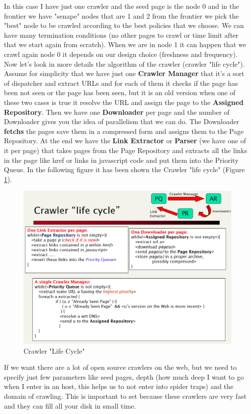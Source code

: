 In this case I have just one crawler and the seed page is the node 0 and in the frontier we have "senape" nodes that are 1 and 2 from the frontier we pick the "best" node to be crawled according to the best policies that we choose. We can have many termination conditions (no other pages to crawl or time limit after that we start again from scratch). When we are in node 1 it can happen that we crawl again node 0 it depends on our design choice (freshness and frequency).\newline
Now let's look in more details the algorithm of the crawler (crawler "life cycle"). Assume for simplicity that we have just one \textbf{Crawler Manager} that it's a sort of dispatcher and extract URLs and for each of them it checks if the page has been not seen or the page has been seen, but it is an old version when one of these two cases is true it resolve the URL and assign the page to the \textbf{Assigned Repository}. Then we have one \textbf{Downloader} per page and the number of Downloader gives you the idea of parallelism that we can do. The Downloader \textbf{fetchs} the pages save them in a compressed form and assigns them to the Page Repository. At the end we have the \textbf{Link Extractor} or \textbf{Parser} (we have one of it per page) that takes pages from the Page Repository and extracts all the links in the page like href or links in javascript code and put them into the Priority Queue.\newline
In the following figure it has been shown the Crawler "life cycle" (Figure \ref{fig:lifecycle}).
\begin{figure}
    \centering
    \includegraphics[width=0.75\linewidth]{images/lifecycle.png}
    \caption{Crawler "Life Cycle"}
    \label{fig:lifecycle}
\end{figure}
If we want there are a lot of open source crawlers on the web, but we need to specify just few parameters like seed pages, depth (how much deep I want to go when I enter in an host, this helps us to not enter into spider traps) and the domain of crawling. This is important to set because these crawlers are very fast and they can fill all your disk in small time.\newline
